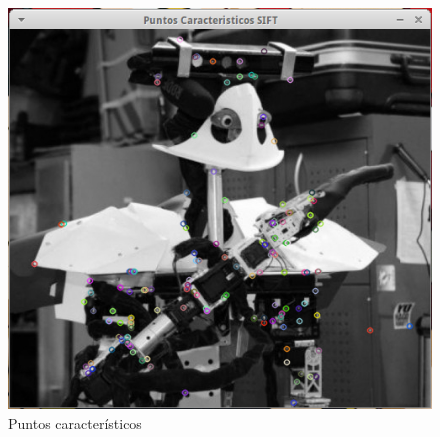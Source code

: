 \begin{figure}[h]
			\centering
				\includegraphics[scale=1]{img/KeyPoints.png}
			\caption{Puntos característicos}
\end{figure}















